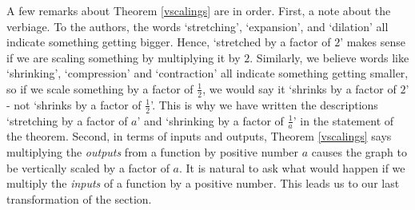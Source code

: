 
\smallskip


A few remarks about Theorem \ref{vscalings} are in order.  First, a note about the verbiage.  To the authors, the words `stretching', `expansion', and `dilation' all indicate something getting bigger.  Hence, `stretched by a factor of $2$' makes sense if we are scaling something by multiplying it by $2$.  Similarly, we believe words like `shrinking', `compression' and `contraction' all indicate something getting smaller, so if we scale something by a factor of $\frac{1}{2}$, we would say it `shrinks by a factor of $2$' - not `shrinks by a factor of $\frac{1}{2}$'.  This is why we have written the descriptions `stretching by a factor of $a$' and `shrinking by a factor of $\frac{1}{a}$' in the statement of the theorem.  Second, in terms of inputs and outputs, Theorem \ref{vscalings} says multiplying the \textit{outputs} from a function by positive number $a$ causes the graph to be vertically scaled by a factor of $a$.  It is natural to ask what would happen if we multiply the \textit{inputs} of a function by a positive number.  This leads us to our last transformation of the section.

\smallskip

